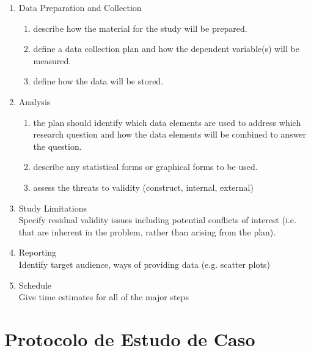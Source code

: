 \begin{anexosenv}
\begin{enumerate}
\begin{enumerate}
	\end{enumerate}
\item Data Preparation and Collection
	\begin{enumerate}
	\item describe how the material for the study will be prepared.
	\item define a data collection plan and how the dependent variable(s) will be measured.
	\item define how the data will be stored.
	\end{enumerate}
\item Analysis
	\begin{enumerate}
	\item the plan should identify which data elements are used to address which research question and how the data elements will be combined to answer the question.
	\item describe any statistical forms or graphical forms to be used.
	\item assess the threats to validity (construct, internal, external)	
	\end{enumerate}
\item Study Limitations \\
Specify residual validity issues including potential conflicts of interest (i.e. that are inherent in the problem, rather than arising from the plan).

\item Reporting \\
Identify target audience, ways of providing data (e.g. scatter plots)

\item Schedule \\
Give time estimates for all of the major steps
\end{enumerate}


\chapter{Protocolo de Estudo de Caso}
	

\end{anexosenv}

